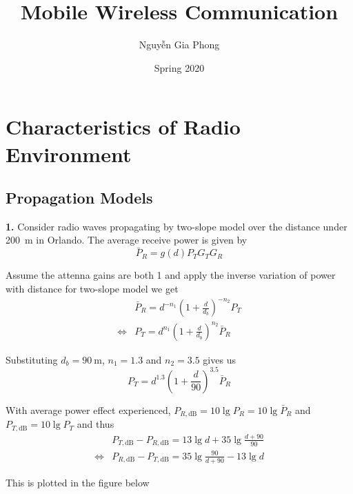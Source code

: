 \documentclass[a4paper,12pt]{article}
\title{Mobile Wireless Communication}
\author{Nguyễn Gia Phong}
\date{Spring 2020}
\newcommand{\problem}[1]{\noindent\textbf{#1.}}
\begin{document}
\maketitle
\setcounter{section}{1}
\section{Characteristics of Radio Environment}
\subsection{Propagation Models}
\problem 1  Consider radio waves propagating by two-slope model over the
distance under \SI{200}{\metre} in Orlando.  The average receive power is given by
\[\bar P_R = g(d) P_T G_T G_R\]

Assume the attenna gains are both 1 and apply the inverse variation of power
with distance for two-slope model we get
\begin{align*}
  &\bar P_R = d^{-n_1}\left(1 + \frac{d}{d_b}\right)^{-n_2} P_T\\
  \iff &P_T = d^{n_1}\left(1 + \frac{d}{d_b}\right)^{n_2}\bar P_R
\end{align*}

Substituting $d_b = \SI{90}{\metre}$, $n_1 = 1.3$ and $n_2 = 3.5$ gives us
\[P_T = d^{1.3}\left(1 + \frac{d}{90}\right)^{3.5}\bar P_R\]

With average power effect experienced, $P_{R,\si{\deci\bel}} = 10\lg P_R
= 10\lg \bar P_R$ and $P_{T,\si{\deci\bel}} = 10\lg P_T$ and thus
\begin{align*}
  &P_{T,\si{\deci\bel}} - P_{R,\si{\deci\bel}}
  = 13\lg d + 35\lg\frac{d + 90}{90}\\
  \iff &P_{R,\si{\deci\bel}} - P_{T,\si{\deci\bel}}
  = 35\lg\frac{90}{d + 90} - 13\lg d
\end{align*}
\pagebreak

This is plotted in the figure below
\begin{center}
\end{center}
\end{document}
